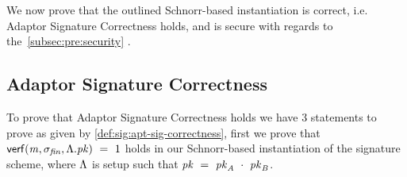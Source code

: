 We now prove that the outlined Schnorr-based instantiation is correct, i.e. Adaptor Signature Correctness holds, and is secure with regards to the~\cref{subsec:pre:security} .

\subsection{Adaptor Signature Correctness}\label{subsec:sig:aptsig-correctness}

To prove that Adaptor Signature Correctness holds we have 3 statements to prove as given by \cref{def:sig:apt-sig-correctness}, first we prove that $\mathsf{verf}(\mathit{m}, \sigma_{\mathit{fin}}, \Lambda.\mathit{pk}) ~=~ 1$ holds in our Schnorr-based instantiation of the signature scheme, where $\Lambda$ is setup such that $\mathit{pk} ~=~ \mathit{pk}_{\mathit{A}} ~\cdot~ \mathit{pk}_{\mathit{B}}$.

